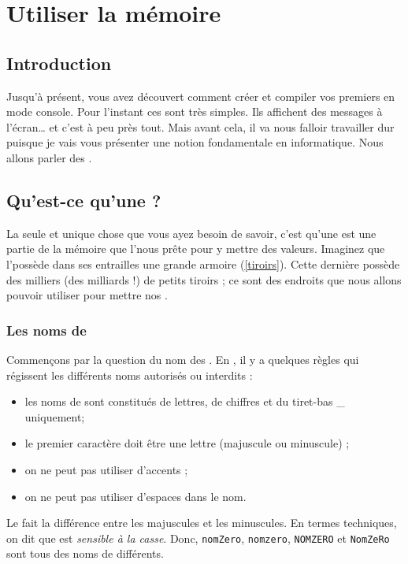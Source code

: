 \chapter{Utiliser la mémoire}
\section{Introduction}
Jusqu'à présent, vous avez découvert comment créer et compiler vos premiers \progs en mode console. Pour l'instant ces \progs sont très simples. Ils affichent des messages à l'écran… et c'est à peu près tout.
Mais avant cela, il va nous falloir travailler dur puisque je vais vous présenter une notion fondamentale en informatique. Nous allons parler des\emph{ \varis}.
\section{Qu'est-ce qu'une \vari ?}
La seule et unique chose que vous ayez besoin de savoir, c'est qu'une \vari est une partie de la mémoire que l'\ordi nous prête pour y mettre des valeurs. Imaginez que l'\ordi possède dans ses entrailles une grande armoire (\fig \ref{tiroirs}). Cette dernière possède des milliers (des milliards !) de petits tiroirs ; ce sont des endroits que nous allons pouvoir utiliser pour mettre nos \varis.


\subsection{Les noms de \varis}
Commençons par la question du nom des \varis. En \cplus, il y a quelques règles qui régissent les différents noms autorisés ou interdits :

\begin{itemize}
	\item les noms de \varis sont constitués de lettres, de chiffres et du tiret-bas \_ uniquement;
	\item le premier caractère doit être une lettre (majuscule ou minuscule) ;
	\item on ne peut pas utiliser d'accents ;
	\item on ne peut pas utiliser d'espaces dans le nom.
\end{itemize}

 Le \lang fait la différence entre les majuscules et les minuscules. En termes techniques, on dit que \cplus est \emph{sensible à la casse}. Donc, \lstinline|nomZero|,  \lstinline|nomzero|,  \lstinline|NOMZERO| et \lstinline|NomZeRo| sont tous des noms de \varis différents.
